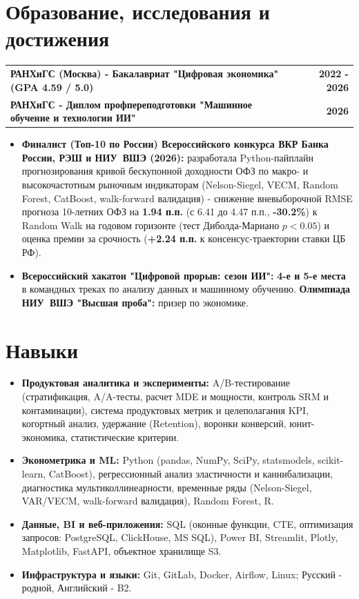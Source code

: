 \documentclass[a4paper,10pt]{article}
\begin{document}
\section{Образование, исследования и достижения}
\begin{tabularx}{\linewidth}{@{} X r @{}}
\textbf{\mbox{РАНХиГС} (Москва) - Бакалавриат "Цифровая экономика" (GPA 4.59 / 5.0)} & \textbf{2022 - 2026} \\
\textbf{\mbox{РАНХиГС} - Диплом профпереподготовки "Машинное обучение и технологии ИИ"} & \textbf{2026} \\
\end{tabularx}
\vspace{2.5pt}
\begin{itemize}[itemsep=2.5pt, parsep=0pt, topsep=0pt, leftmargin=1.3em, label=\footnotesize$\bullet$]
    \item \textbf{Финалист (Топ-10 по России) Всероссийского конкурса ВКР Банка России, РЭШ и \mbox{НИУ ВШЭ} (2026):} разработала Python-пайплайн прогнозирования кривой бескупонной доходности ОФЗ по макро- и высокочастотным рыночным индикаторам (Nelson-Siegel, VECM, Random Forest, CatBoost, walk-forward валидация) - снижение вневыборочной RMSE прогноза 10-летних ОФЗ на \textbf{1.94 п.п.} (с 6.41 до 4.47 п.п., \textbf{-30.2\%}) к Random Walk на годовом горизонте (тест Диболда-Мариано $p < 0.05$) и оценка премии за срочность (\textbf{+2.24 п.п.} к консенсус-траектории ставки ЦБ РФ).
    \item \textbf{Всероссийский хакатон "Цифровой прорыв: сезон ИИ":} \textbf{4-е и 5-е места} в командных треках по анализу данных и машинному обучению. \textbf{Олимпиада \mbox{НИУ ВШЭ} "Высшая проба":} призер по экономике.
\end{itemize}

\section{Навыки}
\begin{itemize}[itemsep=2.5pt, parsep=0pt, topsep=0pt, leftmargin=1.3em, label=\footnotesize$\bullet$]
    \item \textbf{Продуктовая аналитика и эксперименты:} A/B-тестирование (стратификация, A/A-тесты, расчет MDE и мощности, контроль SRM и контаминации), система продуктовых метрик и целеполагания KPI, когортный анализ, удержание (Retention), воронки конверсий, юнит-экономика, статистические критерии.
    \item \textbf{Эконометрика и ML:} Python (pandas, NumPy, SciPy, statsmodels, scikit-learn, CatBoost), регрессионный анализ эластичности и каннибализации, диагностика мультиколлинеарности, временные ряды (Nelson-Siegel, VAR/VECM, walk-forward валидация), Random Forest, R.
    \item \textbf{Данные, BI и веб-приложения:} SQL (оконные функции, CTE, оптимизация запросов: PostgreSQL, ClickHouse, MS SQL), Power BI, Streamlit, Plotly, Matplotlib, FastAPI, объектное хранилище S3.
    \item \textbf{Инфраструктура и языки:} Git, GitLab, Docker, Airflow, Linux; Русский - родной, Английский - B2.
\end{itemize}
\end{document}
